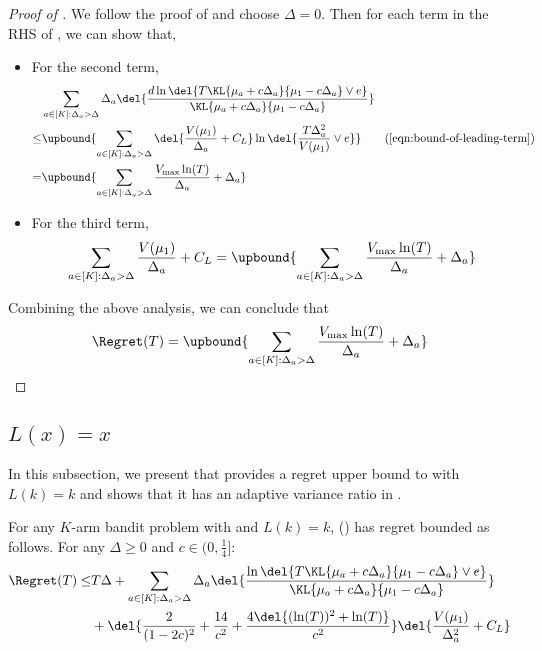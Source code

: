 \begin{proof}[Proof of ]
     We follow the proof of  and choose $\Delta = 0$. Then for each term in the RHS of , we can show that,
     \begin{itemize}
         \item For the second term,
         \begin{align*}
            & \sum_{a\in[K]: \Delta_a > \Delta} \Delta_a \del{\frac{d\ln\del{T\KL{\mu_a+c\Delta_a}{\mu_1-c\Delta_a} \vee e}}{\KL{\mu_a+c\Delta_a}{\mu_1-c\Delta_a}}}
            \\
            \leq&
            \upbound{ \sum_{a\in[K]: \Delta_a > \Delta} \del{\frac{V(\mu_1)}{\Delta_a} + C_L}\ln\del{\frac{T\Delta_a^2}{V(\mu_1)} \vee e}}
                \tag{\Cref{eqn:bound-of-leading-term}}
            \\
            =&
            \upbound{ \sum_{a\in[K]: \Delta_a > \Delta} \frac{V_{\max}\ln(T)}{\Delta_a} + \Delta_a}
         \end{align*}
         \item For the third term,
         \begin{align*}
             \sum_{a\in[K]: \Delta_a > \Delta} \frac{V(\mu_1)}{\Delta_a} + C_L
             =
             \upbound{ \sum_{a\in[K]: \Delta_a > \Delta}\frac{V_{\max}\ln(T)}{\Delta_a} + \Delta_a }
         \end{align*}
     \end{itemize}
     Combining the above analysis, we can conclude that
     \[
        \Regret(T) = \upbound{ \sum_{a\in[K]: \Delta_a > \Delta}\frac{V_{\max}\ln(T)}{\Delta_a} + \Delta_a }
     \]
\end{proof}

\subsection{$L(x) = x$}
In this subsection, we present  that provides a regret upper bound to \gexpklms with $L(k) = k$ and shows that it has an adaptive variance ratio in .
\begin{theorem}  \label{thm:expected-regret-total-version-identity}
    For any $K$-arm bandit problem with    and $L(k) = k$, 
    \gexpklms () has regret bounded as follows. 
    For any $\Delta \geq 0$ and $c \in (0, \frac{1}{4}]$: 
    \begin{align*}
        \Regret(T)
        \leq&
        T \Delta + \sum_{a\in[K]: \Delta_a > \Delta} \Delta_a \del{\frac{\ln\del{T\KL{\mu_a+c\Delta_a}{\mu_1-c\Delta_a} \vee e}}{\KL{\mu_a+c\Delta_a}{\mu_1-c\Delta_a}}}
        \\
        &+ 
        \del{\frac{2}{(1-2c)^2} + \frac{14}{c^2} + \frac{4\del{(\ln(T))^2+\ln(T)}}{c^2}} \del{\frac{V(\mu_1)}{\Delta_a^2} + C_L} 
            \label{eqn:exp-kl-ms-identity-regret}
    \end{align*}
\end{theorem}


